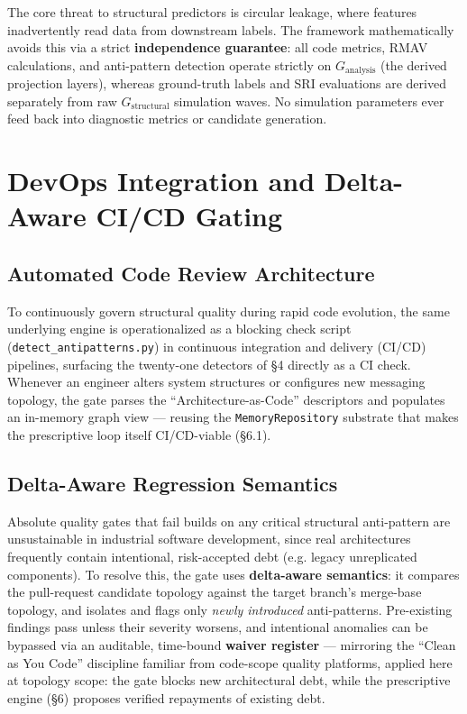 \documentclass[11pt]{article}
\begin{document}
The core threat to structural predictors is circular leakage, where features inadvertently read data
from downstream labels. The framework mathematically avoids this via a strict \textbf{independence
guarantee}: all code metrics, RMAV calculations, and anti-pattern detection operate strictly on
$G_{\text{analysis}}$ (the derived projection layers), whereas ground-truth labels and SRI evaluations
are derived separately from raw $G_{\text{structural}}$ simulation waves. No simulation parameters ever
feed back into diagnostic metrics or candidate generation.

\section{DevOps Integration and Delta-Aware CI/CD Gating}

\subsection{Automated Code Review Architecture}

To continuously govern structural quality during rapid code evolution, the same underlying engine is
operationalized as a blocking check script (\texttt{detect\_antipatterns.py}) in continuous
integration and delivery (CI/CD) pipelines, surfacing the twenty-one detectors of \S4 directly as a CI
check. Whenever an engineer alters system structures or configures new messaging topology, the gate
parses the ``Architecture-as-Code'' descriptors and populates an in-memory graph view --- reusing the
\texttt{MemoryRepository} substrate that makes the prescriptive loop itself CI/CD-viable (\S6.1).

\subsection{Delta-Aware Regression Semantics}

Absolute quality gates that fail builds on any critical structural anti-pattern are unsustainable in
industrial software development, since real architectures frequently contain intentional,
risk-accepted debt (e.g. legacy unreplicated components). To resolve this, the gate uses
\textbf{delta-aware semantics}: it compares the pull-request candidate topology against the target
branch's merge-base topology, and isolates and flags only \emph{newly introduced} anti-patterns.
Pre-existing findings pass unless their severity worsens, and intentional anomalies can be bypassed via
an auditable, time-bound \textbf{waiver register} --- mirroring the ``Clean as You Code'' discipline
familiar from code-scope quality platforms, applied here at topology scope: the gate blocks new
architectural debt, while the prescriptive engine (\S6) proposes verified repayments of existing debt.
\end{document}
